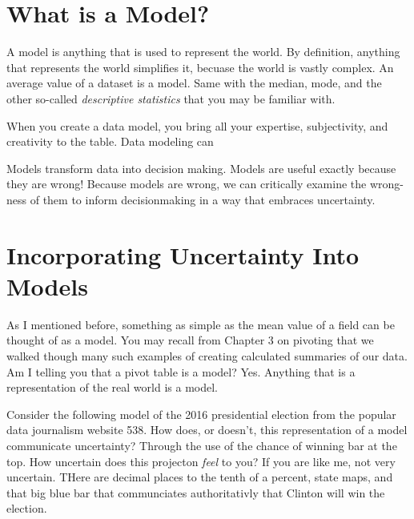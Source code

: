 \documentclass[]{book}
\begin{document}
\hypertarget{what-is-a-model}{%
\section{What is a Model?}\label{what-is-a-model}}

A model is anything that is used to represent the world. By definition, anything that represents the world simplifies it, becuase the world is vastly complex. An average value of a dataset is a model. Same with the median, mode, and the other so-called \emph{descriptive statistics} that you may be familiar with.

When you create a data model, you bring all your expertise, subjectivity, and creativity to the table. Data modeling can

Models transform data into decision making. Models are useful exactly because they are wrong! Because models are wrong, we can critically examine the wrong-ness of them to inform decisionmaking in a way that embraces uncertainty.

\hypertarget{incorporating-uncertainty-into-models}{%
\section{Incorporating Uncertainty Into Models}\label{incorporating-uncertainty-into-models}}

As I mentioned before, something as simple as the mean value of a field can be thought of as a model. You may recall from Chapter 3 on pivoting that we walked though many such examples of creating calculated summaries of our data. Am I telling you that a pivot table is a model? Yes. Anything that is a representation of the real world is a model.

Consider the following model of the 2016 presidential election from the popular data journalism website 538. How does, or doesn't, this representation of a model communicate uncertainty? Through the use of the chance of winning bar at the top. How uncertain does this projecton \emph{feel} to you? If you are like me, not very uncertain. THere are decimal places to the tenth of a percent, state maps, and that big blue bar that communciates authoritativly that Clinton will win the election.
\end{document}
